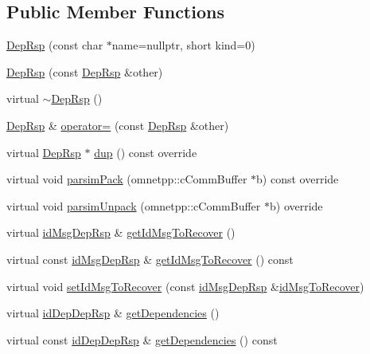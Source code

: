 \subsection*{Public Member Functions}
\begin{DoxyCompactItemize}
\item 
\hyperlink{classDepRsp_a86d6896d681e4467ec52c660738893ed}{Dep\+Rsp} (const char $\ast$name=nullptr, short kind=0)
\item 
\hyperlink{classDepRsp_a3b5894b34b151dced8080a6e5757c2a2}{Dep\+Rsp} (const \hyperlink{classDepRsp}{Dep\+Rsp} \&other)
\item 
virtual \hyperlink{classDepRsp_aa4c1e70c5fd15e5a9541b58999df3480}{$\sim$\+Dep\+Rsp} ()
\item 
\hyperlink{classDepRsp}{Dep\+Rsp} \& \hyperlink{classDepRsp_a3297f65b6eb05d7d5d203562b4d48c4a}{operator=} (const \hyperlink{classDepRsp}{Dep\+Rsp} \&other)
\item 
virtual \hyperlink{classDepRsp}{Dep\+Rsp} $\ast$ \hyperlink{classDepRsp_af70e467ce29aac0e865ac06c3a021019}{dup} () const override
\item 
virtual void \hyperlink{classDepRsp_a2125eed5bc70db3cc55e41e144c8716f}{parsim\+Pack} (omnetpp\+::c\+Comm\+Buffer $\ast$b) const override
\item 
virtual void \hyperlink{classDepRsp_a8d8d59c349898c4dfb9da1845ba0acdd}{parsim\+Unpack} (omnetpp\+::c\+Comm\+Buffer $\ast$b) override
\item 
virtual \hyperlink{depRsp__m_8h_a8a41011e0821f196429cd4bc45638bcf}{id\+Msg\+Dep\+Rsp} \& \hyperlink{classDepRsp_a7558f4f82be1ce27c894a068e2811ec6}{get\+Id\+Msg\+To\+Recover} ()
\item 
virtual const \hyperlink{depRsp__m_8h_a8a41011e0821f196429cd4bc45638bcf}{id\+Msg\+Dep\+Rsp} \& \hyperlink{classDepRsp_a209fe969214c0bf673d12a27bb923f92}{get\+Id\+Msg\+To\+Recover} () const
\item 
virtual void \hyperlink{classDepRsp_a6aea88bdf4ba7b9c4876823278e880b0}{set\+Id\+Msg\+To\+Recover} (const \hyperlink{depRsp__m_8h_a8a41011e0821f196429cd4bc45638bcf}{id\+Msg\+Dep\+Rsp} \&\hyperlink{classDepRsp_a7b777428e859ba7a6f083e13f6431cf4}{id\+Msg\+To\+Recover})
\item 
virtual \hyperlink{depRsp__m_8h_a3c2ceb107008eb344443aaab2eb872b8}{id\+Dep\+Dep\+Rsp} \& \hyperlink{classDepRsp_a507c1f42135deca6079b31f5fe8da301}{get\+Dependencies} ()
\item 
virtual const \hyperlink{depRsp__m_8h_a3c2ceb107008eb344443aaab2eb872b8}{id\+Dep\+Dep\+Rsp} \& \hyperlink{classDepRsp_ad7d207f5cb583e04c7a8a6127bcb3fff}{get\+Dependencies} () const

\end{DoxyCompactItemize}
